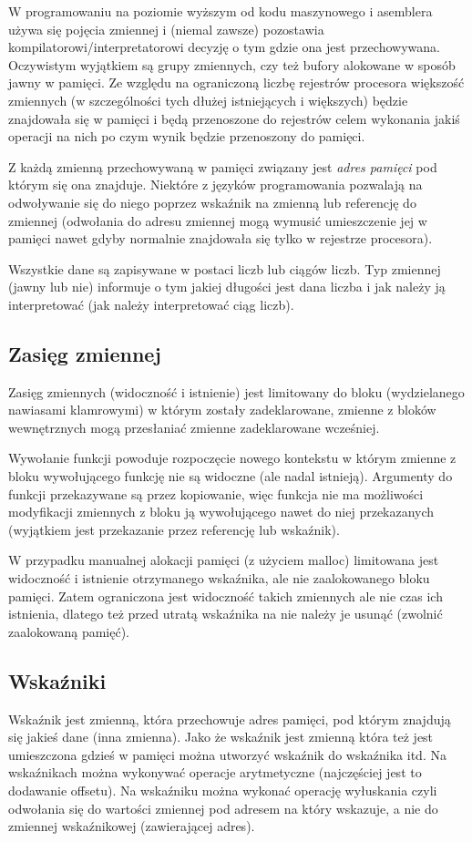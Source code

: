 \documentclass{pdfBooklets}
\begin{document}
W programowaniu na poziomie wyższym od kodu maszynowego i asemblera używa się pojęcia zmiennej i (niemal zawsze) pozostawia kompilatorowi/interpretatorowi decyzję o tym gdzie ona jest przechowywana. Oczywistym wyjątkiem są grupy zmiennych, czy też bufory alokowane w sposób jawny w pamięci. Ze względu na ograniczoną liczbę rejestrów procesora większość zmiennych (w szczególności tych dłużej istniejących i większych) będzie znajdowała się w pamięci i będą przenoszone do rejestrów celem wykonania jakiś operacji na nich po czym wynik będzie przenoszony do pamięci.

Z każdą zmienną przechowywaną w pamięci związany jest \emph{adres pamięci} pod którym się ona znajduje. Niektóre z języków programowania pozwalają na odwoływanie się do niego poprzez wskaźnik na zmienną lub referencję do zmiennej (odwołania do adresu zmiennej mogą wymusić umieszczenie jej w pamięci nawet gdyby normalnie znajdowała się tylko w rejestrze procesora).

Wszystkie dane są zapisywane w postaci liczb lub ciągów liczb. Typ zmiennej (jawny lub nie) informuje o tym jakiej długości jest dana liczba i jak należy ją interpretować (jak należy interpretować ciąg liczb). 

\subsection{Zasięg zmiennej}
Zasięg zmiennych (widoczność i istnienie) jest limitowany do bloku (wydzielanego nawiasami klamrowymi) w którym zostały zadeklarowane, zmienne z bloków wewnętrznych mogą przesłaniać zmienne zadeklarowane wcześniej.

Wywołanie funkcji powoduje rozpoczęcie nowego kontekstu w którym zmienne z bloku wywołującego funkcję nie są widoczne (ale nadal istnieją). Argumenty do funkcji przekazywane są przez kopiowanie, więc funkcja nie ma możliwości modyfikacji zmiennych z bloku ją wywołującego nawet do niej przekazanych (wyjątkiem jest przekazanie przez referencję lub wskaźnik).

W przypadku manualnej alokacji pamięci (z użyciem malloc) limitowana jest widoczność i istnienie otrzymanego wskaźnika, ale nie zaalokowanego bloku pamięci. Zatem ograniczona jest widoczność takich zmiennych ale nie czas ich istnienia, dlatego też przed utratą wskaźnika na nie należy je usunąć (zwolnić zaalokowaną pamięć). 

\subsection{Wskaźniki}
Wskaźnik jest zmienną, która przechowuje adres pamięci, pod którym znajdują się jakieś dane (inna zmienna). Jako że wskaźnik jest zmienną która też jest umieszczona gdzieś w pamięci można utworzyć wskaźnik do wskaźnika itd. Na wskaźnikach można wykonywać operacje arytmetyczne (najczęściej jest to dodawanie offsetu). Na wskaźniku można wykonać operację wyłuskania czyli odwołania się do wartości zmiennej pod adresem na który wskazuje, a nie do zmiennej wskaźnikowej (zawierającej adres).
\end{document}
